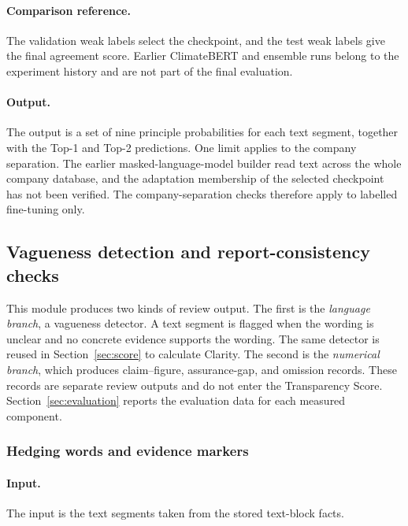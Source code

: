 \paragraph{Comparison reference.} The validation weak labels select the checkpoint, and the test weak labels give the final agreement score. Earlier ClimateBERT and ensemble runs belong to the experiment history and are not part of the final evaluation.

\paragraph{Output.} The output is a set of nine principle probabilities for each text segment, together with the Top-1 and Top-2 predictions. One limit applies to the company separation. The earlier masked-language-model builder read text across the whole company database, and the adaptation membership of the selected checkpoint has not been verified. The company-separation checks therefore apply to labelled fine-tuning only.

\subsection{Vagueness detection and report-consistency checks}
\label{sec:detector}

This module produces two kinds of review output. The first is the \emph{language branch}, a vagueness detector. A text segment is flagged when the wording is unclear and no concrete evidence supports the wording. The same detector is reused in Section~\ref{sec:score} to calculate Clarity. The second is the \emph{numerical branch}, which produces claim--figure, assurance-gap, and omission records. These records are separate review outputs and do not enter the Transparency Score. Section~\ref{sec:evaluation} reports the evaluation data for each measured component.

\subsubsection{Hedging words and evidence markers}

\paragraph{Input.} The input is the text segments taken from the stored text-block facts.

